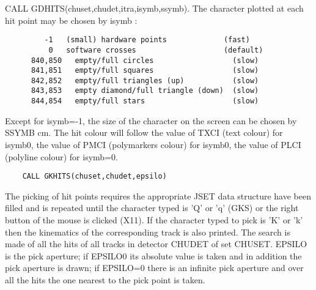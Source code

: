    \par
CALL GDHITS(chuset,chudet,itra,isymb,ssymb).  The character plotted at each 
   hit point may be chosen by isymb :  
\begin{verbatim}
         -1   (small) hardware points             (fast)
          0   software crosses                    (default)
      840,850   empty/full circles                  (slow)
      841,851   empty/full squares                  (slow)
      842,852   empty/full triangles (up)           (slow)
      843,853   empty diamond/full triangle (down)  (slow)
      844,854   empty/full stars                    (slow)
\end{verbatim}
   \par
Except for isymb=-1, the size of the character on the screen can be chosen 
   by SSYMB cm. The hit colour will follow the value of TXCI (text colour) for 
   isymb\KET{}0, the value of PMCI (polymarkers colour) for isymb\BRA{}0, the 
   value of PLCI (polyline colour) for isymb=0.  

\ENDCMD


\BEGARG
{}
\ENDARG

\begin{verbatim}
    CALL GKHITS(chuset,chudet,epsilo)
\end{verbatim}
   \par
The picking of hit points requires the appropriate JSET data structure have 
   been filled and is  repeated until the character typed is 'Q' or 'q' (GKS) 
   or the right button of the mouse is clicked (X11).  If the character typed 
   to pick is 'K' or 'k' then the kinematics of the corresponding track is 
   also printed.  The search is made of all the hits of all tracks in detector 
   CHUDET of set CHUSET.  EPSILO is the pick aperture; if EPSILO\BRA{}0 its 
   absolute value is taken and in addition the pick aperture is drawn; if 
   EPSILO=0 there is an infinite pick aperture and over all the hits the one 
   nearest to the pick point is taken.  

\ENDCMD


\BEGARG
{}
\ENDARG

